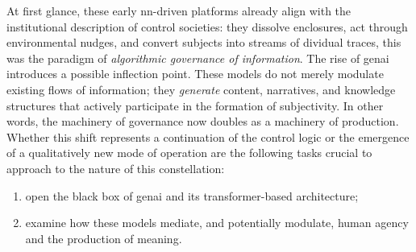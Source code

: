 At first glance, these early \gls{nn}-driven platforms already align with the institutional description of control societies: they dissolve enclosures, act through environmental nudges, and convert subjects into streams of dividual traces, this was the paradigm of \emph{algorithmic governance of information}. The rise of \gls{genai} introduces a possible inflection point. These models do not merely modulate existing flows of information; they \emph{generate} content, narratives, and knowledge structures that actively participate in the formation of subjectivity. In other words, the machinery of governance now doubles as a machinery of production. Whether this shift represents a continuation of the control logic or the emergence of a qualitatively new mode of operation are the following tasks crucial to approach to the nature of this constellation:

\begin{enumerate}
	\item open the black box of \gls{genai} and its transformer-based architecture;
	\item examine how these models mediate, and potentially modulate, human agency and the production of meaning.
\end{enumerate}


